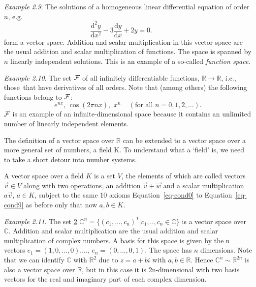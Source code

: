 \documentclass[
  letterpaper,
  DIV=11,
  numbers=noendperiod]{scrartcl}
\theoremstyle{remark}
\newenvironment{fbxSimple}[3]{\begin{tcolorbox}[enhanced, breakable,%
attach boxed title to top*={xshift=1.4pt},
boxed title style={boxrule=0.0mm, fuzzy shadow={1pt}{-1pt}{0mm}{0.1mm}{gray}, arc=.3em, rounded corners=east, sharp corners=west}, colframe=#1-color2, colbacktitle=#1-color1, colback = white, coltitle=black,  titlerule=0mm, toprule=0pt, bottomrule=.7pt, leftrule=.3em, rightrule=.7pt, outer arc=.3em,  	left=.5em, right=.5em, bottomtitle=1mm, toptitle=1mm,title=\textbf{#2}\hspace{0.5em}{#3}]}
{\end{tcolorbox}}
\begin{document}
\emph{Example 2.9}. The solutions of a homogeneous linear differential
equation of order \(n\), e.g.
\[\frac{\mathrm{d}^{2}y}{\mathrm{d}x^{2}}-3\frac{\mathrm{d}y}{\mathrm{d}x}
+2y=0.\qquad\] form a vector space. Addition and scalar multiplication
in this vector space are the usual addition and scalar multiplication of
functions. The space is spanned by \(n\) linearly independent solutions.
This is an example of a so-called \emph{function space}.

\emph{Example 2.10}. The set \({\cal F}\) of all infinitely
differentiable functions, \(\mathbb{R} \rightarrow \mathbb{R}\), i.e.,
those~that have derivatives of all orders. Note that (among others) the
following functions belong to \({\cal F}\):
\[e^{nx},\,\cos \left( 2\pi nx\right)
,\,\,x^{n}\quad \,(\text{for all }n=0,1,2,...).\] \({\cal F}\) is an
example of an infinite-dimensional space because it contains an
unlimited number of linearly independent elements.

The definition of a vector space over \(\mathbb{R}\) can be extended to
a vector space over a more general set of numbers, a field K. To
understand what a `field' is, we need to take a short detour into number
systems.

\label{vksoverk}
\begin{fbxSimple}{Definition}{Definition 2: }{Vector Space over K}
\label{vksoverk}
A vector space over a field \(K\) is a set \(V\), the elements of which
are called vectors \(\vec{v} \in V\) along with two operations, an
addition \(\vec{v} + \vec{w}\) and a scalar multiplication
\(a \vec{v}\), \(a \in K\), subject to the same 10 axioms
Equation~\ref{eq-cond0} to Equation~\ref{eq-cond9} as before only that
now \(a,b\in K\).

\end{fbxSimple}

\emph{Example 2.11}. The set \hyperref[vksoverk]{2}
\(\mathbb{C}^{n} =\{ (c_{1},...,c_{n})^{T}| c_{1},..,c_{n}\in \mathbb{C}\}\)
is a vector space over \(\mathbb{C}\). Addition and scalar
multiplication are the usual addition and scalar multiplication of
complex numbers. A basis for this space is given by the n vectors
\(e_{1}=(1,0,...,0)\),..., \(e_{n}=(0,...,0,1)\). The space has \(n\)
dimensions. Note that we can identify \(\mathbb{C}\) with
\(\mathbb{R}^{2}\) due to \(z= a + b i\) with \(a,b \in \mathbb{R}\).
Hence \(\mathbb{C}^{n}  \sim \mathbb{R}^{2n}\) is also a vector space
over \(\mathbb{R}\), but in this case it is 2n-dimensional with two
basis vectors for the real and imaginary part of each complex dimension.
\end{document}
